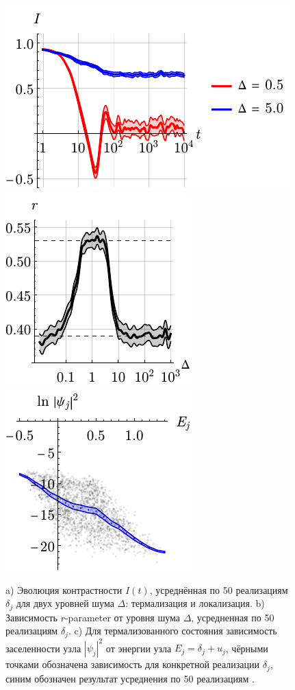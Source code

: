  
\begin{figure}
    \centering
    \includegraphics{imgs/2Dth_loc.pdf}
    \includegraphics{imgs/2Drdel.pdf}
    \includegraphics{imgs/2Dtherm_1.pdf}
    \caption{a) Эволюция контрастности $I(t)$, усреднённая по 50 реализациям $\delta_j$ для двух уровней шума $\Delta$: термализация и локализация. b) Зависимость $r$-parameter от уровня шума $\Delta$, усредненная по 50 реализациям $\delta_j$. c) Для термализованного состояния зависимость заселенности узла $|\psi_j|^2$ от энергии узла $E_j = \delta_j + u_j$, чёрными точками обозначена зависимость для конкретной реализации $\delta_j$, синим обозначен результат усреднения по 50 реализациям .}
    \label{fig:2Dtherm}
\end{figure}

